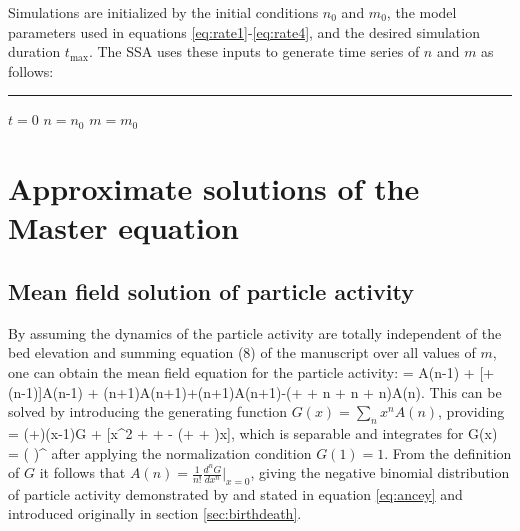 Simulations are initialized by the initial conditions $n_0$ and $m_0$, the model parameters used in equations \ref{eq:rate1}-\ref{eq:rate4}, and the desired simulation duration $t_\text{max}$. The SSA uses these inputs to generate time series of $n$ and $m$ as follows:

\rule{\linewidth}{1pt}

\begin{algorithmic}
	\State $t = 0$ 
	\State $n = n_0$
	\State $m =  m_0$
	
	\EndWhile
\end{algorithmic}

\section{Approximate solutions of the Master equation}

\subsection{Mean field solution of particle activity}

By assuming the dynamics of the particle activity are totally independent of the bed elevation and summing equation (8) of the manuscript over all values of $m$, one can obtain the mean field equation for the particle activity: 
 = \nu A(n-1) + [\lambda + \mu(n-1)]A(n-1) + \sigma(n+1)A(n+1)+\gamma(n+1)A(n+1)-(\nu  + \lambda + \mu n + \sigma n + \gamma n)A(n).\ee
This can be solved by introducing the generating function \citep{Cox1965} $G(x) = \sum_n x^n A(n)$, providing
 = (\nu+\lambda)(x-1)G + [\mu x^2 + \sigma + \gamma - (\mu + \sigma + \gamma)x],\ee
which is separable and integrates for 
\be G(x) = \Bigg( \Bigg)^{\frac{\nu + \lambda}{\mu}}\ee
after applying the normalization condition $G(1)=1$.
From the definition of $G$ it follows that $A(n) = \frac{1}{n!} \frac{d^nG}{dx^n}|_{x=0}$, giving the negative binomial distribution of particle activity demonstrated by \citet{Ancey2008} and stated in equation \ref{eq:ancey} and introduced originally in section \ref{sec:birthdeath}.

